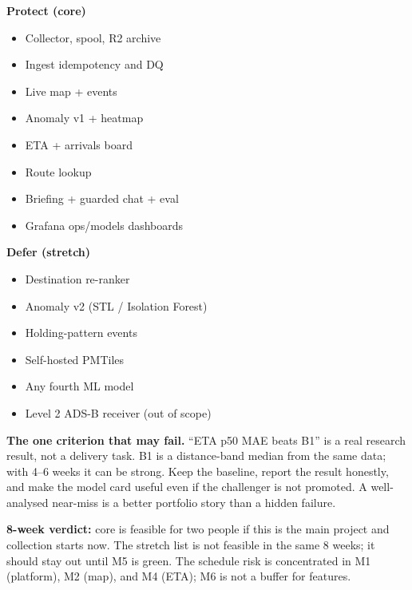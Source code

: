 \documentclass[10.5pt]{article}
\begin{document}
\vspace{4pt}
\begin{minipage}[t]{0.49\linewidth}
\begin{accentcard}
{\bfseries Protect (core)}
\begin{itemize}[leftmargin=1.05em,itemsep=1.5pt,topsep=2pt]
  \item Collector, spool, R2 archive
  \item Ingest idempotency and DQ
  \item Live map + events
  \item Anomaly v1 + heatmap
  \item ETA + arrivals board
  \item Route lookup
  \item Briefing + guarded chat + eval
  \item Grafana ops/models dashboards
\end{itemize}
\end{accentcard}
\end{minipage}\hfill
\begin{minipage}[t]{0.49\linewidth}
\begin{warncard}
{\bfseries Defer (stretch)}
\begin{itemize}[leftmargin=1.05em,itemsep=1.5pt,topsep=2pt]
  \item Destination re-ranker
  \item Anomaly v2 (STL / Isolation Forest)
  \item Holding-pattern events
  \item Self-hosted PMTiles
  \item Any fourth ML model
  \item Level 2 ADS-B receiver (out of scope)
\end{itemize}
\end{warncard}
\end{minipage}

\vspace{4pt}
\begin{warncard}
{\bfseries The one criterion that may fail.} ``ETA p50 MAE beats B1'' is a real research result, not a delivery task. B1 is a distance-band median from the same data; with 4--6 weeks it can be strong. Keep the baseline, report the result honestly, and make the model card useful even if the challenger is not promoted. A well-analysed near-miss is a better portfolio story than a hidden failure.
\end{warncard}

\vspace{2pt}
{\small\color{papermuted}
\textbf{8-week verdict:} core is feasible for two people if this is the main project and collection starts now. The stretch list is not feasible in the same 8 weeks; it should stay out until M5 is green. The schedule risk is concentrated in M1 (platform), M2 (map), and M4 (ETA); M6 is not a buffer for features.
}
\end{document}

